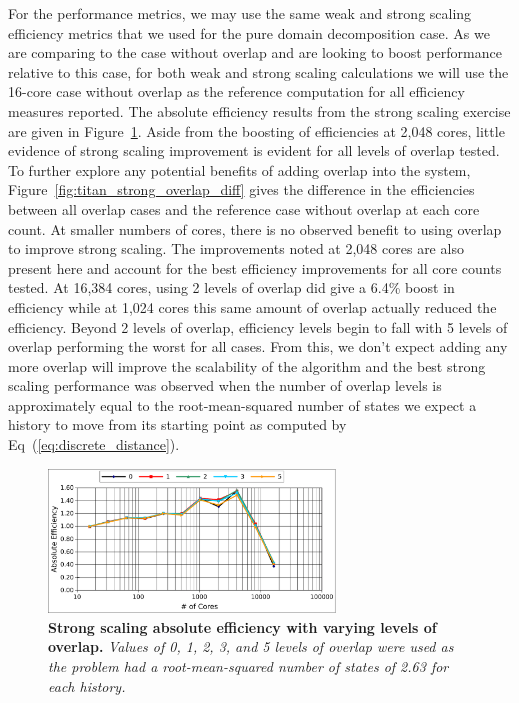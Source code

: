 \documentclass{snamc2013}
\begin{document}
For the performance metrics, we may use the same weak and strong
scaling efficiency metrics that we used for the pure domain
decomposition case. As we are comparing to the case without overlap
and are looking to boost performance relative to this case, for both
weak and strong scaling calculations we will use the 16-core case
without overlap as the reference computation for all efficiency
measures reported. The absolute efficiency results from the strong
scaling exercise are given in
Figure~\ref{fig:titan_strong_overlap}. Aside from the boosting of
efficiencies at 2,048 cores, little evidence of strong scaling
improvement is evident for all levels of overlap tested. To further
explore any potential benefits of adding overlap into the system,
Figure~\ref{fig:titan_strong_overlap_diff} gives the difference in the
efficiencies between all overlap cases and the reference case without
overlap at each core count. At smaller numbers of cores, there is no
observed benefit to using overlap to improve strong scaling. The
improvements noted at 2,048 cores are also present here and account
for the best efficiency improvements for all core counts tested. At
16,384 cores, using 2 levels of overlap did give a 6.4\% boost in
efficiency while at 1,024 cores this same amount of overlap actually
reduced the efficiency. Beyond 2 levels of overlap, efficiency levels
begin to fall with 5 levels of overlap performing the worst for all
cases. From this, we don't expect adding any more overlap will improve
the scalability of the algorithm and the best strong scaling
performance was observed when the number of overlap levels is
approximately equal to the root-mean-squared number of states we
expect a history to move from its starting point as computed by
Eq~(\ref{eq:discrete_distance}).

\begin{figure}[h!]
  \begin{center}
    \includegraphics[width=3in]{titan_strong_overlap.pdf}
  \end{center}
  \caption{\textbf{Strong scaling absolute efficiency with varying
      levels of overlap.} \textit{Values of 0, 1, 2, 3, and 5 levels
      of overlap were used as the problem had a root-mean-squared
      number of states of 2.63 for each history.}}
  \label{fig:titan_strong_overlap}
\end{figure}
\end{document}
